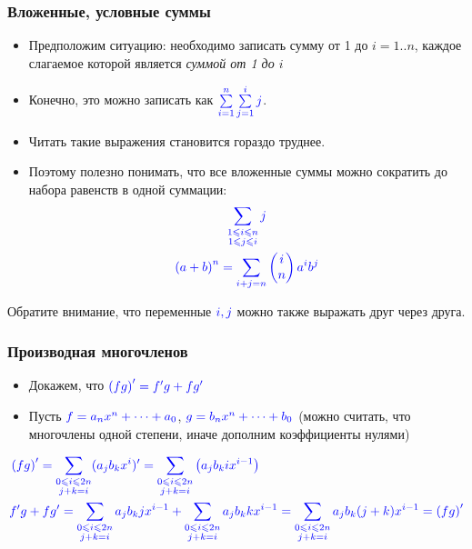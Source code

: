 \begin{frame}[t]
    \small
    \frametitle{Вложенные, условные суммы}
    \begin{itemize}
        \item Предположим ситуацию: необходимо записать сумму от {\color{blue} 1 до $i=1..n$}, каждое слагаемое которой является \textit{\color{blue} суммой от 1 до $i$}
        \item Конечно, это можно записать как $\color{blue} \sum\limits_{i=1}^{n} \sum\limits_{j=1}^{i} j $. 
        \item Читать такие выражения становится {\color{blue} гораздо} труднее. 
        \item Поэтому полезно понимать, что все вложенные суммы можно сократить до набора равенств в {\color{blue} одной} суммации: 
        \begin{gather*}
            \color{blue} \sum_{\substack{1 \leq i \leq n \\ 1 \leq j \leq i}} j \\
            \color{blue} \left( a+b \right)^n = \sum\limits_{i+j = n} \begin{pmatrix} i \\ n \end{pmatrix} a^{i}b^{j}
        \end{gather*}
    \end{itemize}
    \vspace{-3mm}
    Обратите внимание, что переменные $\color{blue} i,j$ можно также выражать друг через друга.
\end{frame}

\begin{frame}[t]
    \frametitle{Производная многочленов}
    \begin{itemize}
        \item Докажем, что $\color{blue} \left( fg \right)' = f'g + fg'$
        \item Пусть $\color{blue} f = a_n x^{n} + \dots + a_0$, $\color{blue} g = b_n x^{n} + \dots + b_0$ (можно считать, что многочлены одной степени, иначе дополним коэффициенты нулями)
    \end{itemize}
    \begin{align*}
        &\color{blue} \left( fg \right)' = \sum_{\substack{0 \leq i \leq 2n \\ j+k=i}} (a_j b_k x^i)' = \sum_{\substack{0 \leq i \leq 2n \\ j+k=i}}  \left( a_j b_k i x^{i-1} \right)  \\ 
        &\color{blue} f'g + fg' = \sum_{\substack{0 \leq i \leq 2n \\ j+k = i}} a_j b_k j x^{i-1} + \sum_{\substack{0 \leq i \leq 2n \\ j + k = i}} a_j b_k k x^{i-1} = \sum_{\substack{0 \leq i \leq 2n \\ j+k=i}} a_j b_k (j+k)x^{i-1} = \left( fg \right)'
    \end{align*}
    \hfill \qedsymbol
\end{frame}

